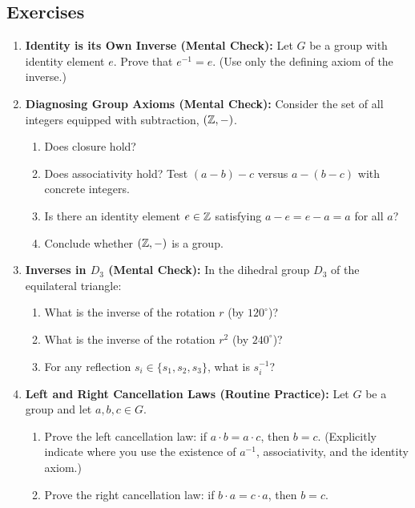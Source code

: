 \subsection{Exercises}

\begin{enumerate}
\item \textbf{Identity is its Own Inverse (Mental Check):} Let $G$ be a group with identity element $e$. Prove that $e^{-1} = e$. (Use only the defining axiom of the inverse.)

\item \textbf{Diagnosing Group Axioms (Mental Check):} Consider the set of all integers equipped with subtraction, $(\mathbb{Z}, -)$.
\begin{enumerate}[label=(\alph*)]
\item Does closure hold?
\item Does associativity hold? Test $(a - b) - c$ versus $a - (b - c)$ with concrete integers.
\item Is there an identity element $e \in \mathbb{Z}$ satisfying $a - e = e - a = a$ for all $a$?
\item Conclude whether $(\mathbb{Z}, -)$ is a group.
\end{enumerate}

\item \textbf{Inverses in $D_3$ (Mental Check):} In the dihedral group $D_3$ of the equilateral triangle:
\begin{enumerate}[label=(\alph*)]
\item What is the inverse of the rotation $r$ (by $120^\circ$)?
\item What is the inverse of the rotation $r^2$ (by $240^\circ$)?
\item For any reflection $s_i \in \{s_1, s_2, s_3\}$, what is $s_i^{-1}$?
\end{enumerate}

\item \textbf{Left and Right Cancellation Laws (Routine Practice):} Let $G$ be a group and let $a, b, c \in G$.
\begin{enumerate}[label=(\alph*)]
\item Prove the left cancellation law: if $a \cdot b = a \cdot c$, then $b = c$. (Explicitly indicate where you use the existence of $a^{-1}$, associativity, and the identity axiom.)
\item Prove the right cancellation law: if $b \cdot a = c \cdot a$, then $b = c$.
\end{enumerate}


\end{enumerate}
